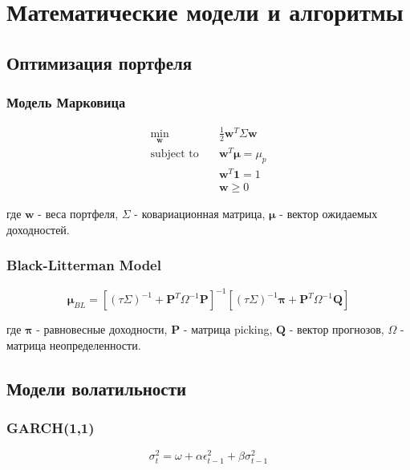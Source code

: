 \documentclass[12pt,a4paper]{article}
\begin{document}
\section{Математические модели и алгоритмы}

\subsection{Оптимизация портфеля}

\subsubsection{Модель Марковица}
\begin{equation}
\begin{aligned}
\min_{\mathbf{w}} \quad & \frac{1}{2}\mathbf{w}^T\Sigma\mathbf{w} \\
\text{subject to} \quad & \mathbf{w}^T\boldsymbol{\mu} = \mu_p \\
& \mathbf{w}^T\mathbf{1} = 1 \\
& \mathbf{w} \geq 0
\end{aligned}
\end{equation}

где $\mathbf{w}$ - веса портфеля, $\Sigma$ - ковариационная матрица, $\boldsymbol{\mu}$ - вектор ожидаемых доходностей.

\subsubsection{Black-Litterman Model}
\begin{equation}
\boldsymbol{\mu}_{BL} = \left[(\tau\Sigma)^{-1} + \mathbf{P}^T\Omega^{-1}\mathbf{P}\right]^{-1}\left[(\tau\Sigma)^{-1}\boldsymbol{\pi} + \mathbf{P}^T\Omega^{-1}\mathbf{Q}\right]
\end{equation}

где $\boldsymbol{\pi}$ - равновесные доходности, $\mathbf{P}$ - матрица picking, $\mathbf{Q}$ - вектор прогнозов, $\Omega$ - матрица неопределенности.

\subsection{Модели волатильности}

\subsubsection{GARCH(1,1)}
\begin{equation}
\sigma_t^2 = \omega + \alpha\epsilon_{t-1}^2 + \beta\sigma_{t-1}^2
\end{equation}
\end{document}
